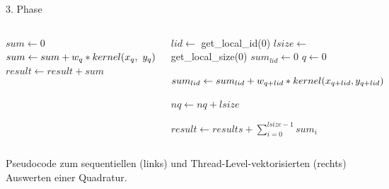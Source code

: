 \documentclass[10pt]{beamer}
\begin{document}
\begin{frame}{3. Phase}
  \begin{columns}
      \begin{algorithm}[H]
        \small{
          \( sum \gets 0 \) \;
          {
            \( sum \gets sum + w_{q} * kernel\relax(x_{q}, \ y_{q}) \) \;
          }
          \( result \gets result + sum \) \;
        }
      \end{algorithm}
      \begin{algorithm}[H]
        \small{
        \( lid \gets \) get\_local\_id\relax(0) \;
        \( lsize \gets \) get\_local\_size\relax(0) \;
        \( sum_{lid} \gets 0 \) \;
        \( q \gets 0 \) \;
        {
          {
            \( sum_{lid} \gets sum_{lid} + w_{q + lid} *
               kernel\relax(x_{q + lid}, y_{q + lid}) \) \;
          }

          \( nq \gets nq + lsize \) \;
        }

        \( result \gets results + \sum\limits_{i = 0}^{lsize - 1} sum_{i} \) \;
        }
      \end{algorithm}
  \end{columns}
  \begin{center}
    Pseudocode zum sequentiellen (links) und Thread-Level-vektorisierten
    (rechts) Auswerten einer Quadratur.
  \end{center}
\end{frame}
\end{document}
